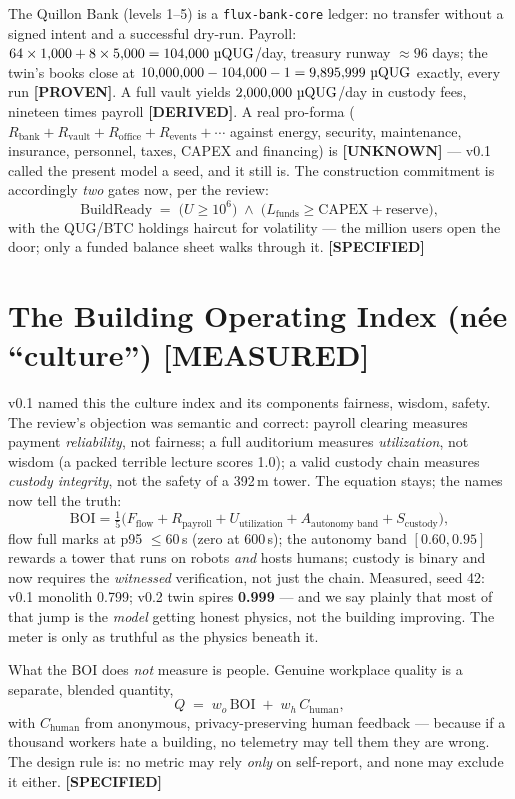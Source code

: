 \documentclass[11pt,a4paper]{article}
\newcommand{\uqug}{\text{\textmu QUG}}
\newcommand{\claim}[1]{\textcolor{qsteel}{\textbf{\footnotesize[#1]}}}
\begin{document}
The Quillon Bank (levels 1--5) is a \texttt{flux-bank-core} ledger: no transfer
without a signed intent and a successful dry-run. Payroll:
$64 \times 1{,}000 + 8 \times 5{,}000 = 104{,}000\ \uqug$/day, treasury runway
$\approx 96$ days; the twin's books close at
$10{,}000{,}000 - 104{,}000 - 1 = 9{,}895{,}999\ \uqug$ exactly, every run
\claim{PROVEN}. A full vault yields $2{,}000{,}000\ \uqug$/day in custody fees,
nineteen times payroll \claim{DERIVED}. A real pro-forma
($R_{\text{bank}} + R_{\text{vault}} + R_{\text{office}} + R_{\text{events}} + \cdots$
against energy, security, maintenance, insurance, personnel, taxes, CAPEX and
financing) is \claim{UNKNOWN} --- v0.1 called the present model a seed, and it
still is. The construction commitment is accordingly \emph{two} gates now, per the
review:
\[
\text{BuildReady} \;=\; \big(U \geq 10^6\big) \;\land\;
\big(L_{\text{funds}} \geq \text{CAPEX} + \text{reserve}\big),
\]
with the QUG/BTC holdings haircut for volatility --- the million users open the
door; only a funded balance sheet walks through it. \claim{SPECIFIED}

\section{The Building Operating Index (n\'ee ``culture'') \hfill \claim{MEASURED}}

v0.1 named this the culture index and its components fairness, wisdom, safety.
The review's objection was semantic and correct: payroll clearing measures payment
\emph{reliability}, not fairness; a full auditorium measures \emph{utilization},
not wisdom (a packed terrible lecture scores 1.0); a valid custody chain measures
\emph{custody integrity}, not the safety of a 392\,m tower. The equation stays;
the names now tell the truth:
\[
\mathrm{BOI} = \tfrac{1}{5}\big(
F_{\text{flow}} + R_{\text{payroll}} + U_{\text{utilization}}
+ A_{\text{autonomy band}} + S_{\text{custody}}\big),
\]
flow full marks at p95 $\leq 60$\,s (zero at 600\,s); the autonomy band $[0.60,
0.95]$ rewards a tower that runs on robots \emph{and} hosts humans; custody is
binary and now requires the \emph{witnessed} verification, not just the chain.
Measured, seed 42: v0.1 monolith 0.799; v0.2 twin spires \textbf{0.999} --- and we
say plainly that most of that jump is the \emph{model} getting honest physics, not
the building improving. The meter is only as truthful as the physics beneath it.

What the BOI does \emph{not} measure is people. Genuine workplace quality is a
separate, blended quantity,
\[
Q \;=\; w_o\,\mathrm{BOI} \;+\; w_h\,C_{\text{human}},
\]
with $C_{\text{human}}$ from anonymous, privacy-preserving human feedback ---
because if a thousand workers hate a building, no telemetry may tell them they are
wrong. The design rule is: no metric may rely \emph{only} on self-report, and none
may exclude it either. \claim{SPECIFIED}
\end{document}
